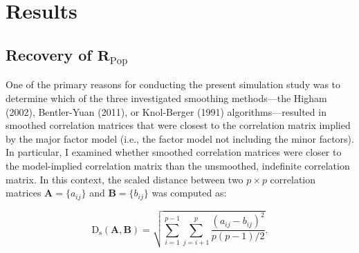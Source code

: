 \documentclass[
  english,
  man]{apa6}
\begin{document}
\hypertarget{results}{%
\section{Results}\label{results}}

\hypertarget{recovery-of-mathbfr_textrmpop}{%
\subsection{\texorpdfstring{Recovery of \(\mathbf{R}_{\textrm{Pop}}\)}{Recovery of \textbackslash mathbf\{R\}\_\{\textbackslash textrm\{Pop\}\}}}\label{recovery-of-mathbfr_textrmpop}}

One of the primary reasons for conducting the present simulation study was to determine which of the three investigated smoothing methods---the Higham (2002), Bentler-Yuan (2011), or Knol-Berger (1991) algorithms---resulted in smoothed correlation matrices that were closest to the correlation matrix implied by the major factor model (i.e., the factor model not including the minor factors). In particular, I examined whether smoothed correlation matrices were closer to the model-implied correlation matrix than the unsmoothed, indefinite correlation matrix. In this context, the scaled distance between two \(p \times p\) correlation matrices \(\mathbf{A} = \{a_{ij}\}\) and \(\mathbf{B} = \{ b_{ij} \}\) was computed as:

\begin{equation}
\mathrm{D}_{\mathrm{s}}(\mathbf{A}, \mathbf{B})=\sqrt{\sum_{i=1}^{p-1} \sum_{j=i+1}^{p} \frac{\left(a_{i j}-b_{i j}\right)^{2}}{p(p-1)/2}}.
\label{eq:scaled-distance}
\end{equation}
\end{document}
